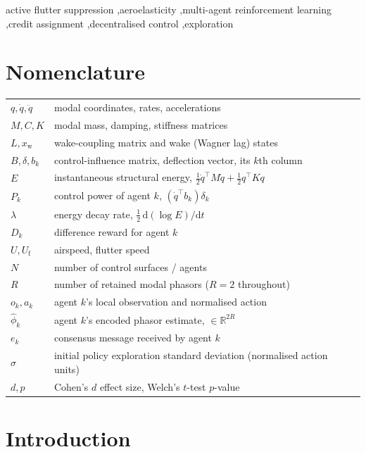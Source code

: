 \documentclass[preprint,11pt,authoryear]{elsarticle}
\newcommand{\Uf}{U_{\mathrm{f}}}
\begin{document}
\begin{frontmatter}
\begin{keyword}
active flutter suppression \sep aeroelasticity \sep multi-agent reinforcement
learning \sep credit assignment \sep decentralised control \sep exploration
\end{keyword}

\end{frontmatter}

\section*{Nomenclature}
\begin{tabular}{@{}lp{10.2cm}@{}}
$q,\dot q,\ddot q$ & modal coordinates, rates, accelerations \\
$M,C,K$ & modal mass, damping, stiffness matrices \\
$L,x_{\mathrm{w}}$ & wake-coupling matrix and wake (Wagner lag) states \\
$B,\delta,b_k$ & control-influence matrix, deflection vector, its $k$th column \\
$E$ & instantaneous structural energy, $\tfrac12\dot q^\top M\dot q+\tfrac12 q^\top Kq$ \\
$P_k$ & control power of agent $k$, $(\dot q^\top b_k)\delta_k$ \\
$\lambda$ & energy decay rate, $\tfrac12\,\mathrm{d}(\log E)/\mathrm{d}t$ \\
$D_k$ & difference reward for agent $k$ \\
$U,\Uf$ & airspeed, flutter speed \\
$N$ & number of control surfaces / agents \\
$R$ & number of retained modal phasors ($R{=}2$ throughout) \\
$o_k,a_k$ & agent $k$'s local observation and normalised action \\
$\hat\phi_k$ & agent $k$'s encoded phasor estimate, $\in\mathbb{R}^{2R}$ \\
$e_k$ & consensus message received by agent $k$ \\
$\sigma$ & initial policy exploration standard deviation (normalised action units) \\
$d,p$ & Cohen's $d$ effect size, Welch's $t$-test $p$-value \\
\end{tabular}

\section{Introduction}
\label{sec:intro}
\end{document}
